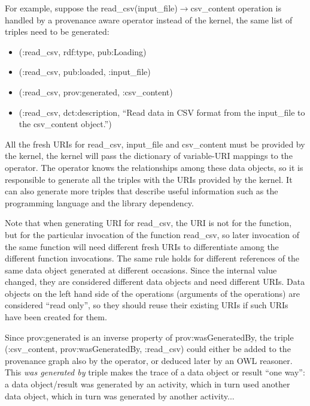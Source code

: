 For example, suppose the read\_csv(input\_file)$\rightarrow$csv\_content operation is handled by a provenance aware operator instead of the kernel, the same list of triples need to be generated:
\begin{itemize}
	\item (:read\_csv, rdf:type, pub:Loading)
	\item (:read\_csv, pub:loaded, :input\_file)
	\item (:read\_csv, prov:generated, :csv\_content)
	\item (:read\_csv, dct:description, ``Read data in CSV format from the input\_file to the csv\_content object.'')
\end{itemize}
All the fresh URIs for read\_csv, input\_file and csv\_content must be provided by the kernel, the kernel will pass the dictionary of variable-URI mappings to the operator. The operator knows the relationships among these data objects, so it is responsible to generate all the triples with the URIs provided by the kernel. It can also generate more triples that describe useful information such as the programming language and the library dependency.

Note that when generating URI for read\_csv, the URI is not for the function, but for the particular invocation of the function read\_csv, so later invocation of the same function will need different fresh URIs to differentiate among the different function invocations. The same rule holds for different references of the same data object generated at different occasions. Since the internal value changed, they are considered different data objects and need different URIs. Data objects on the left hand side of the operations (arguments of the operations) are considered ``read only'', so they should reuse their existing URIs if such URIs have been created for them.

Since prov:generated is an inverse property of prov:wasGeneratedBy, the triple (:csv\_content, prov:wasGeneratedBy, :read\_csv) could either be added to the provenance graph also by the operator, or deduced later by an OWL reasoner. This \emph{was generated by} triple makes the trace of a data object or result ``one way'': a data object/result was generated by an activity, which in turn used another data object, which in turn was generated by another activity...


